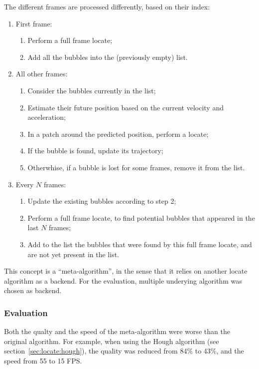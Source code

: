 The different frames are processed differently, based on their index:
\begin{enumerate}
	\itemsep 0em
	\item First frame:
	      \begin{enumerate}
		      \itemsep 0em
		      \item Perform a full frame locate;
		      \item Add all the bubbles into the (previously empty) list.
	      \end{enumerate}
	\item All other frames:
	      \begin{enumerate}
		      \itemsep 0em
		      \item Consider the bubbles currently in the list;
		      \item Estimate their future position based on the current velocity and acceleration;
		      \item In a patch around the predicted position, perform a locate;
		      \item If the bubble is found, update its trajectory;
		      \item Otherwhise, if a bubble is lost for some frames, remove it from the list.
	      \end{enumerate}
	\item Every $N$ frames:
	      \begin{enumerate}
		      \itemsep 0em
		      \item Update the existing bubbles according to step 2;
		      \item Perform a full frame locate, to find potential bubbles that appeared in the last $N$ frames;
		      \item Add to the list the bubbles that were found by this full frame locate, and are not yet present in the list.
	      \end{enumerate}
\end{enumerate}

This concept is a ``meta-algorithm'', in the sense that it relies on another locate algorithm as a backend.
For the evaluation, multiple underying algorithm was chosen as backend.

\subsubsection{Evaluation}

Both the qualty and the speed of the meta-algorithm were worse than the original algorithm.
For example, when using the Hough algorithm (see section~\ref{sec:locate:hough}), the quality was reduced from 84\% to 43\%, and the speed from 55 to 15 FPS.

